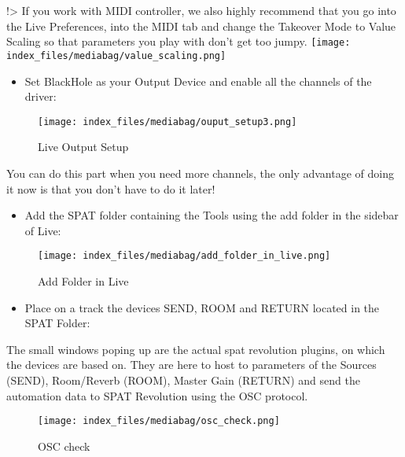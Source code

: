 \documentclass[
  letterpaper,
  DIV=11,
  numbers=noendperiod]{scrreport}
\providecommand{\tightlist}{%
  \setlength{\itemsep}{0pt}\setlength{\parskip}{0pt}}\usepackage{longtable,booktabs,array}
\begin{document}
!\textgreater{} If you work with MIDI controller, we also highly
recommend that you go into the Live Preferences, into the MIDI tab and
change the Takeover Mode to Value Scaling so that parameters you play
with don't get too jumpy.
\texttt{[image: index\_files/mediabag/value\_scaling.png]}

\begin{itemize}
\tightlist
\item
  Set BlackHole as your Output Device and enable all the channels of the
  driver:
\end{itemize}

\begin{figure}

{\centering \texttt{[image: index\_files/mediabag/ouput\_setup3.png]}

}

\caption{Live Output Setup}

\end{figure}

You can do this part when you need more channels, the only advantage of
doing it now is that you don't have to do it later!

\begin{itemize}
\tightlist
\item
  Add the SPAT folder containing the Tools using the add folder in the
  sidebar of Live:
\end{itemize}

\begin{figure}

{\centering \texttt{[image: index\_files/mediabag/add\_folder\_in\_live.png]}

}

\caption{Add Folder in Live}

\end{figure}

\begin{itemize}
\tightlist
\item
  Place on a track the devices SEND, ROOM and RETURN located in the SPAT
  Folder:
\end{itemize}

The small windows poping up are the actual spat revolution plugins, on
which the devices are based on. They are here to host to parameters of
the Sources (SEND), Room/Reverb (ROOM), Master Gain (RETURN) and send
the automation data to SPAT Revolution using the OSC protocol.

\begin{figure}

{\centering \texttt{[image: index\_files/mediabag/osc\_check.png]}

}

\caption{OSC check}

\end{figure}
\end{document}
